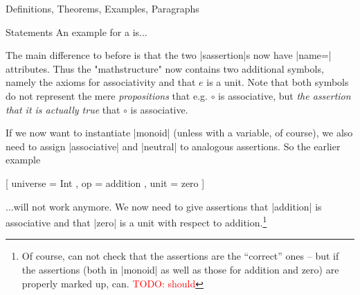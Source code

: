 \begin{sfragment}{Definitions, Theorems, Examples, Paragraphs}
\begin{smodule}{Statements}
{An example for a  is...
    }

    The main difference to before is that the two
    \stexcode|sassertion|s now have |name=| attributes. Thus the \stexcode"mathstructure"
     now contains two additional symbols, namely the axioms for
    associativity and that $e$ is a unit. Note that both symbols do not represent the mere
    \emph{propositions} that e.g.  $\circ$ is associative, but \emph{the assertion that it
      is actually true} that $\circ$ is associative.
    
    If we now want to instantiate |monoid| (unless with a variable,
    of course), we also need to assign |associative| and |neutral|
    to analogous assertions. So the earlier example
    \begin{latexcode}[gobble=8]
        [
            universe = Int ,
            op = addition ,
            unit = zero
        ]
    \end{latexcode}
    ...will not work anymore. We now need to give assertions that
    |addition| is associative and that |zero| is a unit with respect
    to addition.\footnote{Of course, \sTeX can not check that
    the assertions are the ``correct'' ones -- but if
    the assertions (both in |monoid| as well as those for addition and
    zero) are properly marked up, \mmt can. \textcolor{red}{TODO: should}}

\end{smodule}
\end{sfragment}


